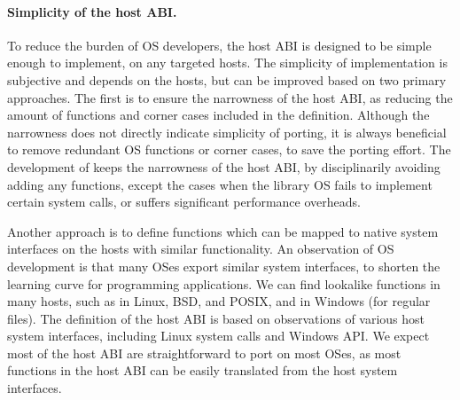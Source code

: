 \paragraph{Simplicity of the host ABI.}
To reduce the burden of OS developers, the host ABI is designed to be simple enough to implement, on any targeted hosts.
The simplicity of implementation is subjective and depends on the hosts,
but can be improved based on two primary approaches.
The first is to ensure the narrowness of the host ABI, as reducing the amount of functions and corner cases included in the definition.
Although the narrowness does not directly indicate simplicity of porting, it is always beneficial to remove redundant OS functions or corner cases,
to save the porting effort.
The development of \graphene{} keeps the narrowness of the host ABI, by disciplinarily avoiding adding any functions,
except the cases when the library OS fails to implement certain system calls,
or suffers significant performance overheads.

Another approach is to define functions which can be mapped to native system interfaces on the hosts with similar functionality.
An observation of OS development is that
many OSes export similar system interfaces, to shorten the learning curve for programming applications.
We can find lookalike functions in many hosts, such as  in Linux, BSD, and POSIX, and  in Windows (for regular files).
The definition of the host ABI
is based on observations of various host system interfaces,
including Linux system calls and Windows API.
We expect most of the host ABI are straightforward to port on most OSes,
as most functions in the host ABI can be easily translated from the host system interfaces.







